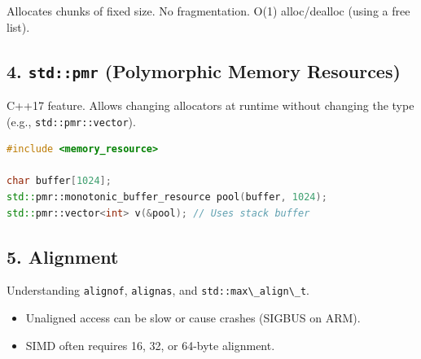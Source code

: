 Allocates chunks of fixed size. No fragmentation. O(1) alloc/dealloc
(using a free list).

\hypertarget{stdpmr-polymorphic-memory-resources}{%
\subsection{\texorpdfstring{4. \texttt{std::pmr} (Polymorphic Memory
Resources)}{4. std::pmr (Polymorphic Memory Resources)}}\label{stdpmr-polymorphic-memory-resources}}

C++17 feature. Allows changing allocators at runtime without changing
the type (e.g., \passthrough{\lstinline!std::pmr::vector!}).

\begin{lstlisting}[language={C++}]
#include <memory_resource>

char buffer[1024];
std::pmr::monotonic_buffer_resource pool(buffer, 1024);
std::pmr::vector<int> v(&pool); // Uses stack buffer
\end{lstlisting}

\hypertarget{alignment}{%
\subsection{5. Alignment}\label{alignment}}

Understanding \passthrough{\lstinline!alignof!},
\passthrough{\lstinline!alignas!}, and
\passthrough{\lstinline!std::max\_align\_t!}.

\begin{itemize}
\tightlist
\item
  Unaligned access can be slow or cause crashes (SIGBUS on ARM).
\item
  SIMD often requires 16, 32, or 64-byte alignment.
\end{itemize}
